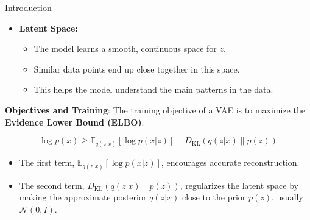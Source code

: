 \begin{frame}[allowframebreaks]{Introduction}
\begin{itemize}
  \framebreak

  \item \textbf{Latent Space:}
    \begin{itemize}
      \item The model learns a smooth, continuous space for \( z \).
      \item Similar data points end up close together in this space.
      \item This helps the model understand the main patterns in the data.
    \end{itemize}
\end{itemize}

\framebreak

\textbf{Objectives and Training}: The training objective of a VAE is to maximize the \textbf{Evidence Lower Bound (ELBO)}:



\[
\log p(x) \geq \mathbb{E}_{q(z|x)}[\log p(x|z)] - D_{\mathrm{KL}}(q(z|x) \| p(z))
\]

\begin{itemize}
  \item The first term, \( \mathbb{E}_{q(z|x)}[\log p(x|z)] \), encourages accurate reconstruction.
  \item The second term, \( D_{\mathrm{KL}}(q(z|x) \| p(z)) \), regularizes the latent space by making the approximate posterior \( q(z|x) \) close to the prior \( p(z) \), usually \( \mathcal{N}(0, I) \).
\end{itemize}


\end{frame}
